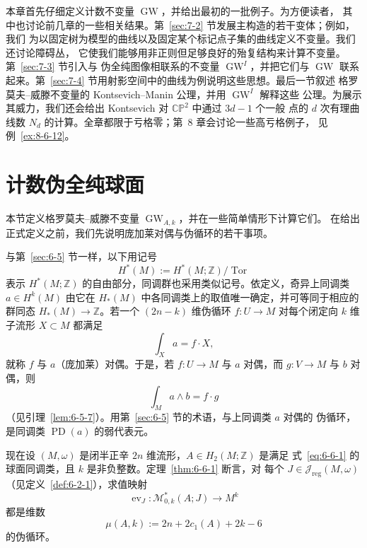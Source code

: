 本章首先仔细定义计数不变量 $\operatorname{GW}$，并给出最初的一批例子。为方便读者，
其中也讨论前几章的一些相关结果。第~\ref{sec:7-2} 节发展主构造的若干变体；例如，我们
为以固定树为模型的曲线以及固定某个标记点子集的曲线定义不变量。我们还讨论障碍丛，
它使我们能够用非正则但足够良好的殆复结构来计算不变量。第~\ref{sec:7-3} 节引入与
伪全纯图像相联系的不变量 $\operatorname{GW}^I$，并把它们与 $\operatorname{GW}$ 联系
起来。第~\ref{sec:7-4} 节用射影空间中的曲线为例说明这些思想。最后一节叙述
格罗莫夫--威滕不变量的 Kontsevich--Manin 公理，并用 $\operatorname{GW}^I$ 解释这些
公理。为展示其威力，我们还会给出 Kontsevich 对 $\mathbb{CP}^2$ 中通过 $3d-1$ 个一般
点的 $d$ 次有理曲线数 $N_d$ 的计算。全章都限于亏格零；第~8 章会讨论一些高亏格例子，
见例~\ref{ex:8-6-12}。

\section{计数伪全纯球面}\label{sec:7-1}

本节定义格罗莫夫--威滕不变量 $\operatorname{GW}_{A,k}$，并在一些简单情形下计算它们。
在给出正式定义之前，我们先说明庞加莱对偶与伪循环的若干事项。

与第~\ref{sec:6-5} 节一样，以下用记号
\[
  H^*(M):=H^*(M;\mathbb Z)/\operatorname{Tor}
\]
表示 $H^*(M;\mathbb Z)$ 的自由部分，同调群也采用类似记号。依定义，奇异上同调类
$a\in H^k(M)$ 由它在 $H_*(M)$ 中各同调类上的取值唯一确定，并可等同于相应的群同态
$H_*(M)\to\mathbb Z$。若一个 $(2n-k)$ 维伪循环 $f:U\to M$ 对每个闭定向 $k$ 维
子流形 $X\subset M$ 都满足
\[
  \int_X a=f\cdot X,
\]
就称 $f$ 与 $a$（庞加莱）对偶。于是，若 $f:U\to M$ 与 $a$ 对偶，而
$g:V\to M$ 与 $b$ 对偶，则
\[
  \int_M a\wedge b=f\cdot g
\]
（见引理~\ref{lem:6-5-7}）。用第~\ref{sec:6-5} 节的术语，与上同调类 $a$ 对偶的
伪循环，是同调类 $\operatorname{PD}(a)$ 的弱代表元。

现在设 $(M,\omega)$ 是闭半正辛 $2n$ 维流形，$A\in H_2(M;\mathbb Z)$ 是满足
式~\eqref{eq:6-6-1} 的球面同调类，且 $k$ 是非负整数。定理~\ref{thm:6-6-1} 断言，对
每个 $J\in\mathcal J_{\mathrm{reg}}(M,\omega)$（见定义~\ref{def:6-2-1}），求值映射
\[
  \operatorname{ev}_J:\mathcal M^*_{0,k}(A;J)\longrightarrow M^k
\]
都是维数
\[
  \mu(A,k):=2n+2c_1(A)+2k-6
\]
的伪循环。

